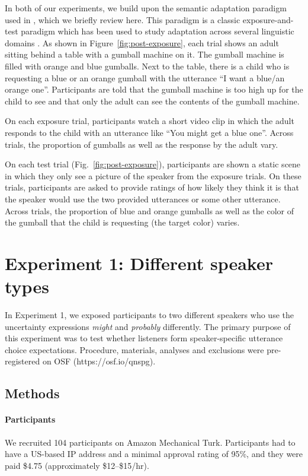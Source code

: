 In both of our experiments, we build upon the semantic adaptation paradigm used in \textcite{Schuster2018}, 
which we briefly review here. This paradigm is a classic exposure-and-test paradigm which has been used to study
adaptation across several linguistic domains  .
As shown in Figure~\ref{fig:post-exposure}, each trial shows
an adult sitting behind a table with a gumball machine on it. The gumball machine is filled with orange and blue
gumballs. Next to the table, there is a child who is requesting
a blue or an orange gumball with the utterance ``I want a blue/an orange one''.  Participants are told that
the gumball machine is too high up for the child to see and that only the adult can see the contents of the gumball machine.

On each exposure trial, participants watch a short video clip in which the adult responds to the child with an utterance like ``You might get a blue one''. Across trials, the proportion
of gumballs as well as the response by the adult vary. 

On each test trial (Fig.~\ref{fig:post-exposure}), participants are shown a static scene in which they only see a picture of the speaker from the exposure trials. On these trials,
participants are asked to provide ratings of how likely they think it is that the speaker would use the two provided utterances or some other utterance.
Across trials, the proportion of blue and orange gumballs as well as the color of the gumball that the child is requesting (the target color) varies.

\section{Experiment 1: Different speaker types}

In Experiment 1, we exposed participants to two different speakers who 
use the uncertainty expressions \textit{might} and \textit{probably} differently. 
The primary purpose of this experiment was to test whether listeners  
form speaker-specific  utterance choice expectations.
Procedure, materials, analyses and exclusions
were pre-registered on OSF (https://osf.io/qnspg).

\subsection{Methods}

\paragraph{Participants}
 We recruited 104 participants on Amazon Mechanical Turk. 
Participants had to have a US-based IP address and a minimal approval rating of 
95\%, and they were paid \$4.75 (approximately \$12--\$15/hr). 

